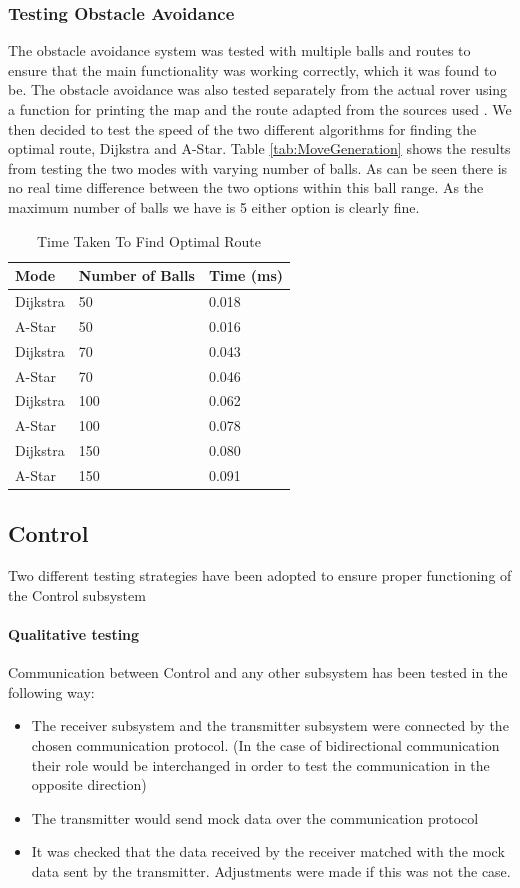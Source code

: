 \documentclass[10pt,twoside]{article}
\begin{document}
\subsubsection{Testing Obstacle Avoidance}
The obstacle avoidance system was tested with multiple balls and routes to ensure that the main functionality was working correctly, which it was found to be. The obstacle avoidance was also tested separately from the actual rover using a function for printing the map and the route adapted from the sources used \cite{AAB}\cite{ImplementationA}. We then decided to test the speed of the two different algorithms for finding the optimal route, Dijkstra and A-Star. Table \ref{tab:MoveGeneration} shows the results from testing the two modes with varying number of balls. As can be seen there is no real time difference between the two options within this ball range. As the maximum number of balls we have is 5 either option is clearly fine.
\begin{table}[hbt]
\centering 
\begin{tabular}{ |p{3cm}||p{3cm}|p{3cm}|  }
 \hline
 Mode & Number of Balls & Time (ms) \\
 \hline
 Dijkstra & 50   & 0.018\\
 A-Star & 50   & 0.016\\
 Dijkstra & 70   &0.043\\
 A-Star & 70   &0.046\\
 Dijkstra & 100 &0.062\\
 A-Star & 100   &0.078\\
 Dijkstra & 150   &0.080\\
 A-Star & 150   &0.091\\
 \hline
\end{tabular}
\caption{\label{tab:Optimal Route} Time Taken To Find Optimal Route}
\end{table}


\subsection{Control}
Two different testing strategies have been adopted to ensure proper functioning of the Control subsystem
\paragraph{Qualitative testing} Communication between Control and any other subsystem has been tested in the following way:
\begin{itemize}[nolistsep]
    \item The receiver subsystem and the transmitter subsystem were connected by the chosen communication protocol. (In the case of bidirectional communication their role would be interchanged in order to test the communication in the opposite direction)
    \item The transmitter would send mock data over the communication protocol
    \item It was checked that the data received by the receiver matched with the mock data sent by the transmitter. Adjustments were made if this was not the case.
\end{itemize}
\end{document}
